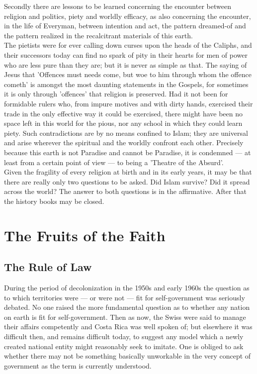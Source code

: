 \documentclass[10pt, twoside]{book}
\begin{document}
Secondly there are lessons to be learned concerning the encounter between religion and politics, 
piety and worldly efficacy, as also concerning the encounter, in the life of Everyman, between 
intention and act, the pattern dreamed\hyp{}of and the pattern realized in the recalcitrant materials of 
this earth. \\

The pietists were for ever calling down curses upon the heads of the Caliphs, and their successors 
today can find no spark of pity in their hearts for men of power who are less pure than they are; but 
it is never as simple as that. The saying of Jesus that 'Offences must needs come, but woe to him 
through whom the offence cometh' is amongst the most daunting statements in the Gospels, for 
sometimes it is only through 'offences' that religion is preserved. Had it not been for formidable 
rulers who, from impure motives and with dirty hands, exercised their trade in the only effective way 
it could be exercised, there might have been no space left in this world for the pious, nor any 
school in which they could learn piety. Such contradictions are by no means confined to Islam; they 
are universal and arise wherever the spiritual and the worldly confront each other. Precisely because 
this earth is not Paradise and cannot be Paradise, it is condemned --- at least from a certain point of 
view --- to being a 'Theatre of the Absurd'. \\

Given the fragility of every religion at birth and in its early years, it may be that there are 
really only two questions to be asked. Did Islam survive? Did it spread across the world? The answer 
to both questions is in the affirmative. After that the history books may be closed. \\


\part{The Fruits of the Faith}
\chapter{The Rule of Law}


During the period of decolonization in the 1950s and early 1960s the question as to which territories 
were --- or were not --- fit for self-government was seriously debated. No one raised the more 
fundamental question as to whether any nation on earth is fit for self\hyp{}government. Then as now, the 
Swiss were said to manage their affairs competently and Costa Rica was well spoken of; but elsewhere 
it was difficult then, and remains difficult today, to suggest any model which a newly created 
national entity might reasonably seek to imitate. One is obliged to ask whether there may not be 
something basically unworkable in the very concept of government as the term is currently understood. \\
\end{document}
